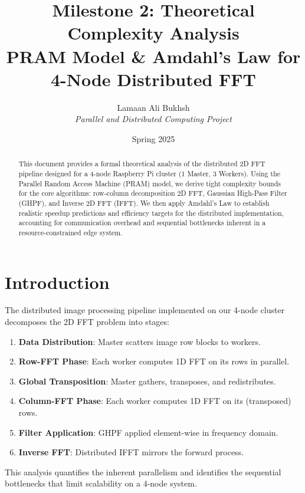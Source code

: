 \documentclass[11pt,a4paper]{article}
\title{Milestone 2: Theoretical Complexity Analysis\\
\large PRAM Model \& Amdahl's Law for 4-Node Distributed FFT}
\author{Lamaan Ali Bukhsh \\ \textit{Parallel and Distributed Computing Project}}
\date{Spring 2025}
\theoremstyle{definition}
\begin{document}
\maketitle

\begin{abstract}
This document provides a formal theoretical analysis of the distributed 2D FFT pipeline designed for a 4-node Raspberry Pi cluster (1 Master, 3 Workers). Using the Parallel Random Access Machine (PRAM) model, we derive tight complexity bounds for the core algorithms: row-column decomposition 2D FFT, Gaussian High-Pass Filter (GHPF), and Inverse 2D FFT (IFFT). We then apply Amdahl's Law to establish realistic speedup predictions and efficiency targets for the distributed implementation, accounting for communication overhead and sequential bottlenecks inherent in a resource-constrained edge system.
\end{abstract}

\tableofcontents
\newpage

\section{Introduction}

The distributed image processing pipeline implemented on our 4-node cluster decomposes the 2D FFT problem into stages:
\begin{enumerate}
    \item \textbf{Data Distribution}: Master scatters image row blocks to workers.
    \item \textbf{Row-FFT Phase}: Each worker computes 1D FFT on its rows in parallel.
    \item \textbf{Global Transposition}: Master gathers, transposes, and redistributes.
    \item \textbf{Column-FFT Phase}: Each worker computes 1D FFT on its (transposed) rows.
    \item \textbf{Filter Application}: GHPF applied element-wise in frequency domain.
    \item \textbf{Inverse FFT}: Distributed IFFT mirrors the forward process.
\end{enumerate}

This analysis quantifies the inherent parallelism and identifies the sequential bottlenecks that limit scalability on a 4-node system.
\end{document}
